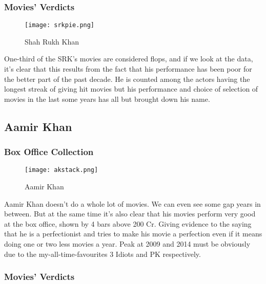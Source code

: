 \documentclass[12pt]{article}
\begin{document}
\clearpage

\subsubsection{Movies' Verdicts}

\begin{figure}[h]
    \texttt{[image: srkpie.png]}
    \caption{Shah Rukh Khan}
    \label{fig:Verdict}
\end{figure}

One-third of the SRK's movies are considered flops, and if we look at the data, it's clear that this results from the fact that his performance has been poor for the better part of the past decade. 
\newline
\newline
He is counted among the actors having the longest streak of giving hit movies but his performance and choice of selection of movies in the last some years has all but brought down his name. 
\clearpage

\subsection{Aamir Khan}

\subsubsection{Box Office Collection}

\begin{figure}[h]
    \texttt{[image: akstack.png]}
    \caption{Aamir Khan}
    \label{fig:BOC}
\end{figure}

 Aamir Khan doesn't do a whole lot of movies. We can even see some gap years in between. But at the same time it's also clear that his movies perform very good at the box office, shown by 4 bars above 200 Cr. Giving evidence to the saying that he is a perfectionist and tries to make his movie a perfection even if it means doing one or two less movies a year.
\newline
\newline
Peak at 2009 and 2014 must be obviously due to the my-all-time-favourites 3 Idiots and PK respectively.

\clearpage

\subsubsection{Movies' Verdicts}
\end{document}
